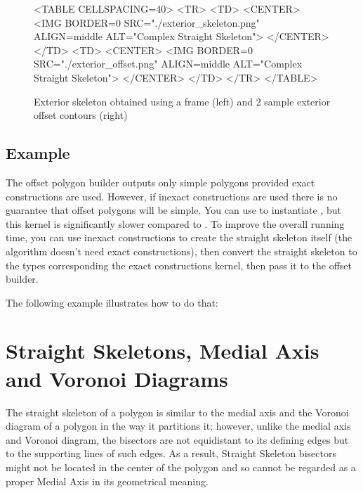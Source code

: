 \begin{figure}[htbp]
\begin{ccHtmlOnly}
<TABLE CELLSPACING=40>
<TR>
<TD>
<CENTER>
<IMG BORDER=0 SRC="./exterior_skeleton.png" ALIGN=middle ALT="Complex Straight Skeleton">
</CENTER>
</TD>
<TD>
<CENTER>
<IMG BORDER=0 SRC="./exterior_offset.png" ALIGN=middle ALT="Complex Straight Skeleton">
</CENTER>
</TD>
</TR>
</TABLE>
\end{ccHtmlOnly}

\caption{Exterior skeleton obtained using a frame (left) and 2 sample exterior offset contours (right)
\label{Exterior}}
\end{figure}

\subsection{Example}


The offset polygon builder outputs only simple polygons provided exact constructions are used. However, if inexact constructions are used there is no guarantee that offset polygons will be simple. You can use  to instantiate , but this kernel is significantly slower compared to
.
To improve the overall running time, you can use inexact constructions to create the straight skeleton itself (the algorithm doesn't need exact constructions), then convert the straight skeleton  to the types corresponding the exact constructions kernel, then pass it to the offset builder.

The following example illustrates how to do that:


\section{Straight Skeletons, Medial Axis and Voronoi Diagrams}  

The straight skeleton of a polygon is similar to the medial
axis and the Voronoi diagram of a polygon in the way it partitions
it; however, unlike the medial axis and Voronoi diagram, the
bisectors are not equidistant to its defining edges but to the
supporting lines of such edges. As a result, Straight Skeleton
bisectors might not be located in the center of the polygon and so
cannot be regarded as a proper Medial Axis in its geometrical meaning.


